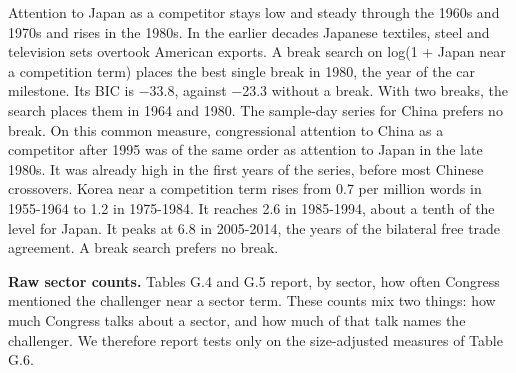 Attention to Japan as a competitor stays low and steady through the
1960s and 1970s and rises in the 1980s. In the earlier decades Japanese
textiles, steel and television sets overtook American exports. A break
search on log(1 + Japan near a competition term) places the best single
break in 1980, the year of the car milestone. Its BIC is −33.8, against
−23.3 without a break. With two breaks, the search places them in 1964
and 1980. The sample-day series for China prefers no break. On this
common measure, congressional attention to China as a competitor after
1995 was of the same order as attention to Japan in the late 1980s. It
was already high in the first years of the series, before most Chinese
crossovers. Korea near a competition term rises from 0.7 per million
words in 1955-1964 to 1.2 in 1975-1984. It reaches 2.6 in 1985-1994,
about a tenth of the level for Japan. It peaks at 6.8 in 2005-2014, the
years of the bilateral free trade agreement. A break search prefers no
break.

\textbf{Raw sector counts.} Tables G.4 and G.5 report, by sector, how
often Congress mentioned the challenger near a sector term. These counts
mix two things: how much Congress talks about a sector, and how much of
that talk names the challenger. We therefore report tests only on the
size-adjusted measures of Table G.6.

